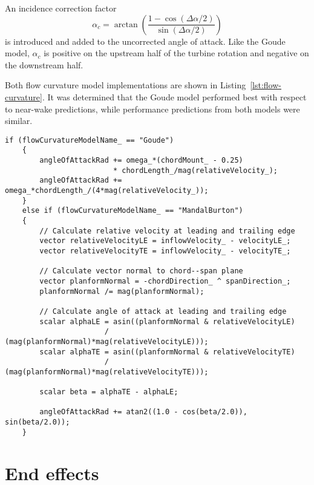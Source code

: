 An incidence correction factor
\begin{equation}
    \alpha_c = \arctan \left( \frac{1 - \cos (\Delta \alpha / 2)}{\sin (\Delta
        \alpha / 2)} \right)
    \label{eq:Mandal-Burton-alpha-corr}
\end{equation}
is introduced and added to the uncorrected angle of attack. Like the Goude
model, $\alpha_c$ is positive on the upstream half of the turbine rotation and
negative on the downstream half. 

Both flow curvature model implementations are shown in
Listing~\ref{lst:flow-curvature}. It was determined that the Goude model
performed best with respect to near-wake predictions, while performance
predictions from both models were similar. 

\begin{lstlisting}[float,caption=Flow curvature model implementation.,label=lst:flow-curvature]
    if (flowCurvatureModelName_ == "Goude")
    {
        angleOfAttackRad += omega_*(chordMount_ - 0.25)
                         * chordLength_/mag(relativeVelocity_);
        angleOfAttackRad += omega_*chordLength_/(4*mag(relativeVelocity_));
    }
    else if (flowCurvatureModelName_ == "MandalBurton")
    {
        // Calculate relative velocity at leading and trailing edge
        vector relativeVelocityLE = inflowVelocity_ - velocityLE_;
        vector relativeVelocityTE = inflowVelocity_ - velocityTE_;
    
        // Calculate vector normal to chord--span plane
        vector planformNormal = -chordDirection_ ^ spanDirection_;
        planformNormal /= mag(planformNormal);
        
        // Calculate angle of attack at leading and trailing edge
        scalar alphaLE = asin((planformNormal & relativeVelocityLE)
                       / (mag(planformNormal)*mag(relativeVelocityLE)));
        scalar alphaTE = asin((planformNormal & relativeVelocityTE)
                       / (mag(planformNormal)*mag(relativeVelocityTE)));
        
        scalar beta = alphaTE - alphaLE;
        
        angleOfAttackRad += atan2((1.0 - cos(beta/2.0)), sin(beta/2.0));
    }
\end{lstlisting}


\section{End effects}

